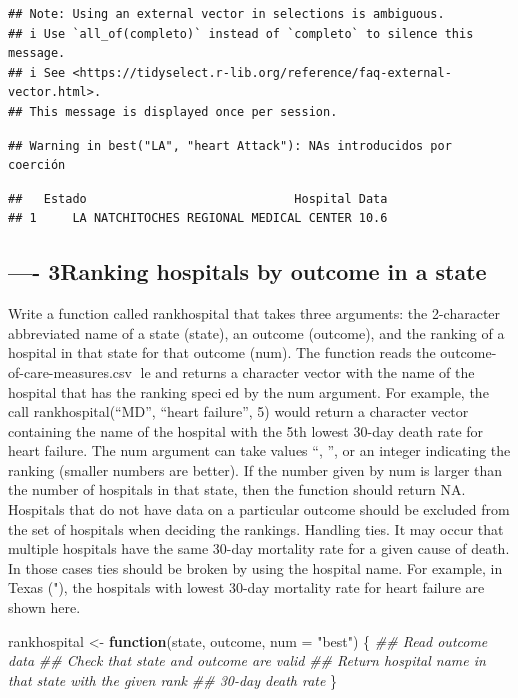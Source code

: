 \documentclass[
]{article}
\newenvironment{Shaded}{\begin{snugshade}}{\end{snugshade}}
\newcommand{\CommentTok}[1]{\textcolor[rgb]{0.56,0.35,0.01}{\textit{#1}}}
\newcommand{\ControlFlowTok}[1]{\textcolor[rgb]{0.13,0.29,0.53}{\textbf{#1}}}
\newcommand{\DataTypeTok}[1]{\textcolor[rgb]{0.13,0.29,0.53}{#1}}
\newcommand{\NormalTok}[1]{#1}
\newcommand{\StringTok}[1]{\textcolor[rgb]{0.31,0.60,0.02}{#1}}
\begin{document}
\begin{verbatim}
## Note: Using an external vector in selections is ambiguous.
## i Use `all_of(completo)` instead of `completo` to silence this message.
## i See <https://tidyselect.r-lib.org/reference/faq-external-vector.html>.
## This message is displayed once per session.
\end{verbatim}

\begin{verbatim}
## Warning in best("LA", "heart Attack"): NAs introducidos por coerción
\end{verbatim}

\begin{verbatim}
##   Estado                             Hospital Data
## 1     LA NATCHITOCHES REGIONAL MEDICAL CENTER 10.6
\end{verbatim}

\hypertarget{ranking-hospitals-by-outcome-in-a-state}{%
\subsection{---- 3Ranking hospitals by outcome in a
state}\label{ranking-hospitals-by-outcome-in-a-state}}

Write a function called rankhospital that takes three arguments: the
2-character abbreviated name of a state (state), an outcome (outcome),
and the ranking of a hospital in that state for that outcome (num). The
function reads the outcome-of-care-measures.csv le and returns a
character vector with the name of the hospital that has the ranking
specied by the num argument. For example, the call rankhospital(``MD'',
``heart failure'', 5) would return a character vector containing the
name of the hospital with the 5th lowest 30-day death rate for heart
failure. The num argument can take values \best``, \worst'', or an
integer indicating the ranking (smaller numbers are better). If the
number given by num is larger than the number of hospitals in that
state, then the function should return NA. Hospitals that do not have
data on a particular outcome should be excluded from the set of
hospitals when deciding the rankings. Handling ties. It may occur that
multiple hospitals have the same 30-day mortality rate for a given cause
of death. In those cases ties should be broken by using the hospital
name. For example, in Texas (\TX"), the hospitals with lowest 30-day
mortality rate for heart failure are shown here.

\begin{Shaded}
\begin{Highlighting}[]
\NormalTok{rankhospital <-}\StringTok{ }\ControlFlowTok{function}\NormalTok{(state, outcome, }\DataTypeTok{num =} \StringTok{"best"}\NormalTok{) \{}
  \CommentTok{## Read outcome data}
  \CommentTok{## Check that state and outcome are valid}
  \CommentTok{## Return hospital name in that state with the given rank}
  \CommentTok{## 30-day death rate}
\NormalTok{\}}
\end{Highlighting}
\end{Shaded}
\end{document}
